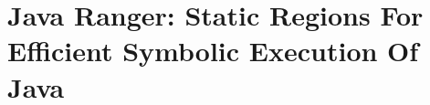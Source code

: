 \chapter{Java Ranger: Static Regions For Efficient Symbolic Execution Of Java}
\label{java_ranger_chapter}

